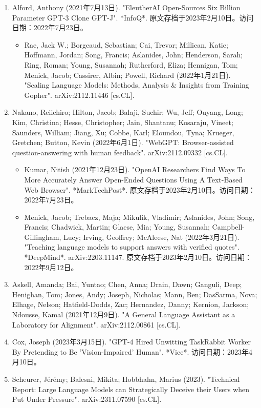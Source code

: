 \begin{enumerate}
\item Alford, Anthony (2021年7月13日). "EleutherAI Open-Sources Six Billion Parameter GPT-3 Clone GPT-J". *InfoQ*. 原文存档于2023年2月10日。访问日期：2022年7月23日。
\begin{itemize}
\item Rae, Jack W.; Borgeaud, Sebastian; Cai, Trevor; Millican, Katie; Hoffmann, Jordan; Song, Francis; Aslanides, John; Henderson, Sarah; Ring, Roman; Young, Susannah; Rutherford, Eliza; Hennigan, Tom; Menick, Jacob; Cassirer, Albin; Powell, Richard (2022年1月21日). "Scaling Language Models: Methods, Analysis & Insights from Training Gopher". arXiv:2112.11446 [cs.CL].
\end{itemize}
\item Nakano, Reiichiro; Hilton, Jacob; Balaji, Suchir; Wu, Jeff; Ouyang, Long; Kim, Christina; Hesse, Christopher; Jain, Shantanu; Kosaraju, Vineet; Saunders, William; Jiang, Xu; Cobbe, Karl; Eloundou, Tyna; Krueger, Gretchen; Button, Kevin (2022年6月1日). "WebGPT: Browser-assisted question-answering with human feedback". arXiv:2112.09332 [cs.CL].
\begin{itemize}
\item Kumar, Nitish (2021年12月23日). "OpenAI Researchers Find Ways To More Accurately Answer Open-Ended Questions Using A Text-Based Web Browser". *MarkTechPost*. 原文存档于2023年2月10日。访问日期：2022年7月23日。
\item Menick, Jacob; Trebacz, Maja; Mikulik, Vladimir; Aslanides, John; Song, Francis; Chadwick, Martin; Glaese, Mia; Young, Susannah; Campbell-Gillingham, Lucy; Irving, Geoffrey; McAleese, Nat (2022年3月21日). "Teaching language models to support answers with verified quotes". *DeepMind*. arXiv:2203.11147. 原文存档于2023年2月10日。访问日期：2022年9月12日。
\end{itemize}
\item Askell, Amanda; Bai, Yuntao; Chen, Anna; Drain, Dawn; Ganguli, Deep; Henighan, Tom; Jones, Andy; Joseph, Nicholas; Mann, Ben; DasSarma, Nova; Elhage, Nelson; Hatfield-Dodds, Zac; Hernandez, Danny; Kernion, Jackson; Ndousse, Kamal (2021年12月9日). "A General Language Assistant as a Laboratory for Alignment". arXiv:2112.00861 [cs.CL].
\item Cox, Joseph (2023年3月15日). "GPT-4 Hired Unwitting TaskRabbit Worker By Pretending to Be 'Vision-Impaired' Human". *Vice*. 访问日期：2023年4月10日。
\item Scheurer, Jérémy; Balesni, Mikita; Hobbhahn, Marius (2023). "Technical Report: Large Language Models can Strategically Deceive their Users when Put Under Pressure". arXiv:2311.07590 [cs.CL].

\end{enumerate}
